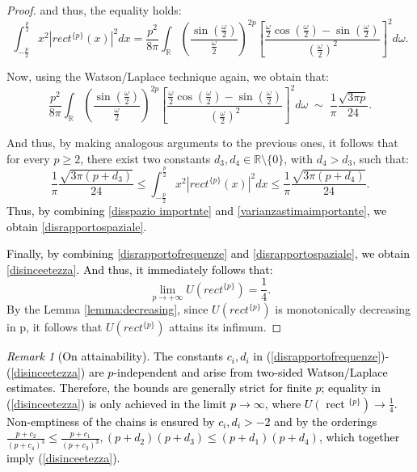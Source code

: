 \documentclass[preprint,hidelinks,authoryear]{elsarticle}
\theoremstyle{plain}
\theoremstyle{definition}
\theoremstyle{remark}
\newtheorem{remark}[theorem]{Remark}
\begin{document}
\begin{proof}
and thus, the equality holds:
\begin{equation}
    \displaystyle\int_{-\frac{p}{2}}^{\frac{p}{2}} x^2|rect^{\{p\}}(x)|^2 dx=\displaystyle\frac{p^2}{8\pi}\displaystyle\int_{\mathbb{R}}\left(\displaystyle\frac{\sin(\frac{\omega}{2})}{\frac{\omega}{2}}\right)^{2p}\left[\displaystyle\frac{\frac{\omega}{2}\cos(\frac{\omega}{2})-\sin(\frac{\omega}{2})}{(\frac{\omega
   }{2})^2}\right]^2 d\omega.
\end{equation}


Now, using the Watson/Laplace technique again, we obtain that:
\begin{equation}
    \displaystyle\frac{p^2}{8\pi}\displaystyle\int_{\mathbb{R}}\left(\displaystyle\frac{\sin(\frac{\omega}{2})}{\frac{\omega}{2}}\right)^{2p}\left[\displaystyle\frac{\frac{\omega}{2}\cos(\frac{\omega}{2})-\sin(\frac{\omega}{2})}{(\frac{\omega
   }{2})^2}\right]^2 d\omega \; \sim \; \displaystyle\frac{1}{\pi}\frac{\sqrt{3\pi p}}{24}.
\end{equation}


And thus, by making analogous arguments to the previous ones, it follows that for every $p \ge 2$, there exist two constants $d_3, d_4 \in \mathbb{R} \setminus \{0\}$, with $d_4 > d_3$, such that: 
\begin{equation}
\displaystyle\frac{1}{\pi}\frac{\sqrt{3\pi (p+d_3)}}{24} \le \displaystyle\int_{-\frac{p}{2}}^{\frac{p}{2}}x^2|rect^{\{p\}}(x)|^2 dx \le \displaystyle\frac{1}{\pi}\frac{\sqrt{3\pi (p+d_4)}}{24}.
\label{varianzastimaimportante}
\end{equation}
\textcolor{black}{Thus, by combining \eqref{disspazio importnte} and \eqref{varianzastimaimportante},  we obtain \eqref{disrapportospaziale}.}



\textcolor{black}{Finally, by combining \eqref{disrapportofrequenze} and \eqref{disrapportospaziale}, we obtain \eqref{disinceetezza}. And thus, it immediately follows that:}
\begin{equation}
    \displaystyle\lim_{p \to +\infty} U(rect^{\{p\}})=\frac{1}{4}.
\end{equation}
By the Lemma \ref{lemma:decreasing}, since $U(rect^{\{p\}})$ is monotonically decreasing in p, it follows that $U(rect^{\{p\}})$ attains its infimum. 
\end{proof}

\textcolor{black}{
\begin{remark}[On attainability]
    The constants $c_i, d_i$ in (\ref{disrapportofrequenze})-(\ref{disinceetezza}) are $p$-independent and arise from two-sided Watson/Laplace estimates. Therefore, the bounds are generally strict for finite $p$; equality in (\ref{disinceetezza}) is only achieved in the limit $p \rightarrow \infty$, where $U\left(\right.$ rect $\left.^{\{p\}}\right) \rightarrow \frac{1}{4}$. Non-emptiness of the chains is ensured by $c_i, d_i>-2$ and by the orderings $\frac{p+c_2}{\left(p+c_4\right)^3} \leq \frac{p+c_1}{\left(p+c_3\right)^3},\left(p+d_2\right)\left(p+d_3\right) \leq\left(p+d_1\right)\left(p+d_4\right)$, which together imply (\ref{disinceetezza}).
\end{remark}}
\end{document}
